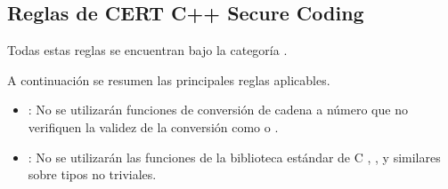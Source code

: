 \subsection{Reglas de CERT C++ Secure Coding}

Todas estas reglas se encuentran bajo la categoría .

A continuación se resumen las principales reglas aplicables.

\begin{itemize}

\item {}:
No se utilizarán funciones de conversión de cadena a número que no
verifiquen la validez de la conversión como  o .

\item {}:
No se utilizarán las funciones de la biblioteca estándar de C
, ,  y similares
sobre tipos no triviales.

\end{itemize}
